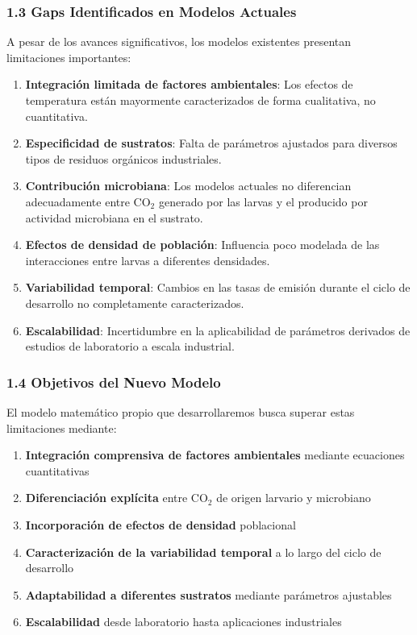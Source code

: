 \documentclass[
]{article}
\providecommand{\tightlist}{%
  \setlength{\itemsep}{0pt}\setlength{\parskip}{0pt}}
\begin{document}
\subsubsection{1.3 Gaps Identificados en Modelos
Actuales}\label{gaps-identificados-en-modelos-actuales}

A pesar de los avances significativos, los modelos existentes presentan
limitaciones importantes:

\begin{enumerate}
\def\labelenumi{\arabic{enumi}.}
\item
  \textbf{Integración limitada de factores ambientales}: Los efectos de
  temperatura están mayormente caracterizados de forma cualitativa, no
  cuantitativa.
\item
  \textbf{Especificidad de sustratos}: Falta de parámetros ajustados
  para diversos tipos de residuos orgánicos industriales.
\item
  \textbf{Contribución microbiana}: Los modelos actuales no diferencian
  adecuadamente entre CO$_2$ generado por las larvas y el producido por
  actividad microbiana en el sustrato.
\item
  \textbf{Efectos de densidad de población}: Influencia poco modelada de
  las interacciones entre larvas a diferentes densidades.
\item
  \textbf{Variabilidad temporal}: Cambios en las tasas de emisión
  durante el ciclo de desarrollo no completamente caracterizados.
\item
  \textbf{Escalabilidad}: Incertidumbre en la aplicabilidad de
  parámetros derivados de estudios de laboratorio a escala industrial.
\end{enumerate}

\subsubsection{1.4 Objetivos del Nuevo
Modelo}\label{objetivos-del-nuevo-modelo}

El modelo matemático propio que desarrollaremos busca superar estas
limitaciones mediante:

\begin{enumerate}
\def\labelenumi{\arabic{enumi}.}
\tightlist
\item
  \textbf{Integración comprensiva de factores ambientales} mediante
  ecuaciones cuantitativas
\item
  \textbf{Diferenciación explícita} entre CO$_2$ de origen larvario y
  microbiano
\item
  \textbf{Incorporación de efectos de densidad} poblacional
\item
  \textbf{Caracterización de la variabilidad temporal} a lo largo del
  ciclo de desarrollo
\item
  \textbf{Adaptabilidad a diferentes sustratos} mediante parámetros
  ajustables
\item
  \textbf{Escalabilidad} desde laboratorio hasta aplicaciones
  industriales
\end{enumerate}
\end{document}

